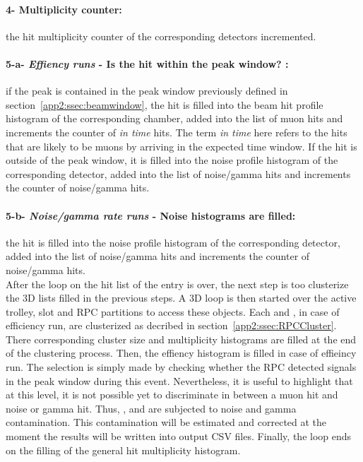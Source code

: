 	\paragraph{4- Multiplicity counter:}  the hit multiplicity counter of the corresponding detectors incremented.
	
	\paragraph{5-a- \textit{Effiency runs} - Is the hit within the peak window? :} if the peak is contained in the peak window previously defined in section~\ref{app2:ssec:beamwindow}, the hit is filled into the beam hit profile histogram of the corresponding chamber, added into the list of muon hits and increments the counter of \textit{in time} hits. The term \textit{in time} here refers to the hits that are likely to be muons by arriving in the expected time window. If the hit is outside of the peak window, it is filled into the noise profile histogram of the corresponding detector, added into the list of noise/gamma hits and increments the counter of noise/gamma hits.
	
	\paragraph{5-b- \textit{Noise/gamma rate runs} - Noise histograms are filled:} the hit is filled into the noise profile histogram of the corresponding detector, added into the list of noise/gamma hits and increments the counter of noise/gamma hits.\\
	
	After the loop on the hit list of the entry is over, the next step is too clusterize the 3D lists filled in the previous steps. A 3D loop is then started over the active trolley, slot and RPC partitions to access these objects. Each  and , in case of efficiency run, are clusterized as decribed in section~\ref{app2:ssec:RPCCluster}. There corresponding cluster size and multiplicity histograms are filled at the end of the clustering process. Then, the effiency histogram is filled in case of effieincy run. The selection is simply made by checking whether the RPC detected signals in the peak window during this event. Nevertheless, it is useful to highlight that at this level, it is not possible yet to discriminate in between a muon hit and noise or gamma hit. Thus, ,  and  are subjected to noise and gamma contamination. This contamination will be estimated and corrected at the moment the results will be written into output CSV files. Finally, the loop ends on the filling of the general hit multiplicity histogram.
	

